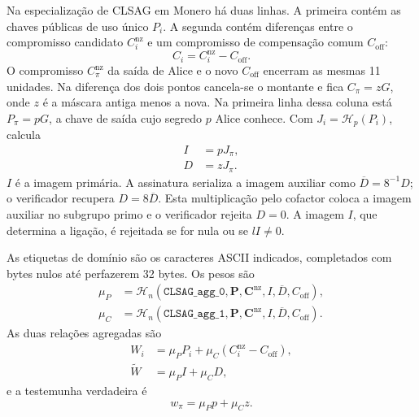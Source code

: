 %
Na especialização de CLSAG em Monero há duas linhas. A primeira contém as
chaves públicas de uso único \(P_i\). A segunda contém diferenças entre
o compromisso candidato
\(C_i^{\mathrm{nz}}\) e um compromisso de compensação comum
\(C_{\mathrm{off}}\):
\[
C_i=C_i^{\mathrm{nz}}-C_{\mathrm{off}}.
\]
O compromisso \(C_\pi^{\mathrm{nz}}\) da saída de Alice e o novo
\(C_{\mathrm{off}}\) encerram as mesmas 11 unidades. Na diferença dos dois pontos cancela-se
o montante e fica \(C_\pi=zG\), onde \(z\) é a máscara antiga menos a nova.
Na primeira linha dessa coluna está \(P_\pi=pG\), a chave de saída
cujo segredo \(p\) Alice conhece. Com
\(J_i=\mathcal H_p(P_i)\), calcula
\begin{align*}
I&=pJ_\pi,\\
D&=zJ_\pi.
\end{align*}
\(I\) é a imagem primária. A assinatura serializa a imagem auxiliar como
\(\overline D=8^{-1}D\); o verificador recupera \(D=8\overline D\). Esta
multiplicação pelo cofactor coloca a imagem auxiliar no subgrupo primo e o
verificador rejeita \(D=0\). A imagem \(I\), que determina a ligação, é
rejeitada se for nula ou se \(lI\neq0\).

As etiquetas de domínio são os caracteres ASCII indicados, completados
com bytes nulos até perfazerem 32 bytes. Os pesos são
\begin{align*}
\mu_P&=\mathcal H_n(
 \texttt{CLSAG\_agg\_0},
 \boldsymbol P,\boldsymbol C^{\mathrm{nz}},
 I,\overline D,C_{\mathrm{off}}),\\
\mu_C&=\mathcal H_n(
 \texttt{CLSAG\_agg\_1},
 \boldsymbol P,\boldsymbol C^{\mathrm{nz}},
 I,\overline D,C_{\mathrm{off}}).
\end{align*}
As duas relações agregadas são
\begin{align*}
W_i&=\mu_PP_i+\mu_C(C_i^{\mathrm{nz}}-C_{\mathrm{off}}),\\
\widetilde W&=\mu_PI+\mu_CD,
\end{align*}
e a testemunha verdadeira é
\[
w_\pi=\mu_Pp+\mu_Cz.
\]

